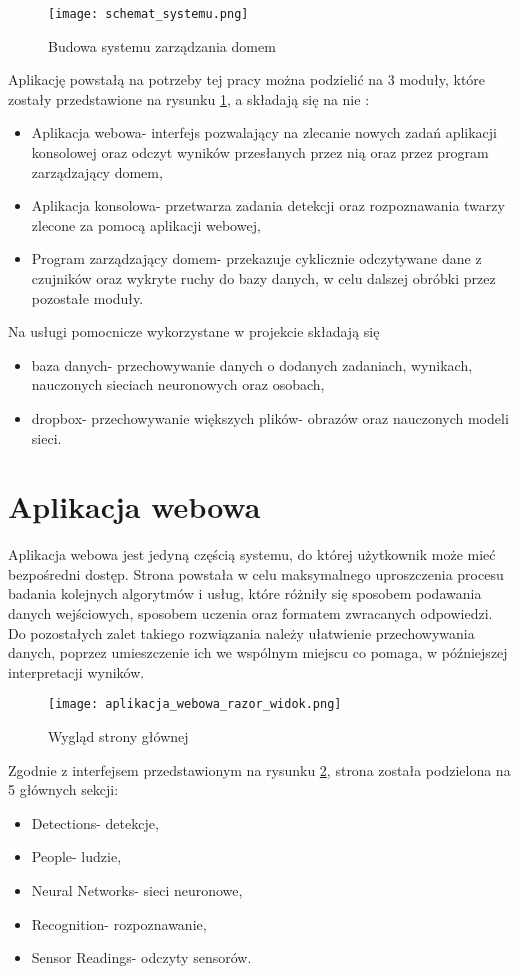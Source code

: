 \begin{figure}[H]
	\centering
	\texttt{[image: schemat\_systemu.png]}
	\caption{Budowa systemu zarządzania domem}
	\label{fig:schemat_systemu}
\end{figure}
Aplikację powstałą na potrzeby tej pracy można podzielić na 3 moduły, które zostały przedstawione na rysunku \ref{fig:schemat_systemu}, a składają się na nie :
\begin{itemize}
\item Aplikacja webowa- interfejs pozwalający na zlecanie nowych zadań aplikacji konsolowej oraz odczyt wyników przesłanych przez nią oraz przez program zarządzający domem,
\item Aplikacja konsolowa- przetwarza zadania detekcji oraz rozpoznawania twarzy zlecone za pomocą aplikacji webowej,
\item Program zarządzający domem- przekazuje cyklicznie odczytywane dane z czujników oraz wykryte ruchy do bazy danych, w celu dalszej obróbki przez pozostałe moduły.
\end{itemize}
Na usługi pomocnicze wykorzystane w projekcie składają się
\begin{itemize}
\item baza danych- przechowywanie danych o dodanych zadaniach, wynikach, nauczonych sieciach neuronowych oraz osobach,
\item dropbox- przechowywanie większych plików- obrazów oraz nauczonych modeli sieci.
\end{itemize}

\section{Aplikacja webowa}
Aplikacja webowa jest jedyną częścią systemu, do której użytkownik może mieć bezpośredni dostęp. Strona powstała w celu maksymalnego uproszczenia procesu badania kolejnych algorytmów i usług, które różniły się sposobem podawania danych wejściowych, sposobem uczenia oraz formatem zwracanych odpowiedzi. Do pozostałych zalet takiego rozwiązania należy ułatwienie przechowywania danych, poprzez umieszczenie ich we wspólnym miejscu co pomaga, w późniejszej interpretacji wyników.
\begin{figure}[H]
	\centering
	\texttt{[image: aplikacja\_webowa\_razor\_widok.png]}
	\caption{Wygląd strony głównej}
	\label{fig:strona_glowna_razor}
\end{figure}
Zgodnie z interfejsem przedstawionym na rysunku \ref{fig:strona_glowna_razor}, strona została podzielona na 5 głównych sekcji:
\begin{itemize}
\item Detections- detekcje,
\item People- ludzie,
\item Neural Networks- sieci neuronowe,
\item Recognition- rozpoznawanie,
\item Sensor Readings- odczyty sensorów.
\end{itemize}

